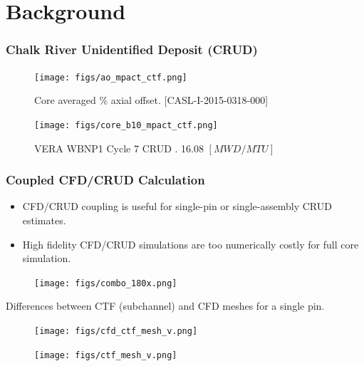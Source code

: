 \documentclass[t, pdftex]{beamer}
\begin{document}
\section{Background}
\begin{frame}
    \frametitle{Chalk River Unidentified Deposit (CRUD)}
    \begin{figure}
        \centering
        \begin{minipage}{.5\textwidth}
            \centering
            \texttt{[image: figs/ao\_mpact\_ctf.png]}
            \caption{Core averaged \% axial offset. [CASL-I-2015-0318-000]}
        \end{minipage}%
        \begin{minipage}{.5\textwidth}
            \centering
            \texttt{[image: figs/core\_b10\_mpact\_ctf.png]}
            \caption{VERA WBNP1 Cycle 7 CRUD . 16.08 $[MWD/MTU]$}
        \end{minipage}
    \end{figure}
\end{frame}

\begin{frame}[shrink=20]
    \frametitle{Coupled CFD/CRUD Calculation}
    \begin{itemize}
    \item CFD/CRUD coupling is useful for single-pin or single-assembly CRUD estimates.
    \item High fidelity CFD/CRUD simulations are too numerically costly for full core simulation.
    \end{itemize}
        \begin{figure}[!htbp]
\centering
\texttt{[image: figs/combo\_180x.png]}
\label{log_closed}
    \end{figure}
\end{frame}

\begin{frame}
Differences between CTF (subchannel) and CFD meshes for a single pin.
\begin{figure}
        \centering
        \begin{minipage}{.4\textwidth}
            \centering
            \texttt{[image: figs/cfd\_ctf\_mesh\_v.png]}
        \end{minipage}%
        \begin{minipage}{.4\textwidth}
            \centering
            \texttt{[image: figs/ctf\_mesh\_v.png]}
        \end{minipage}
\end{figure}
\end{frame}
\end{document}
